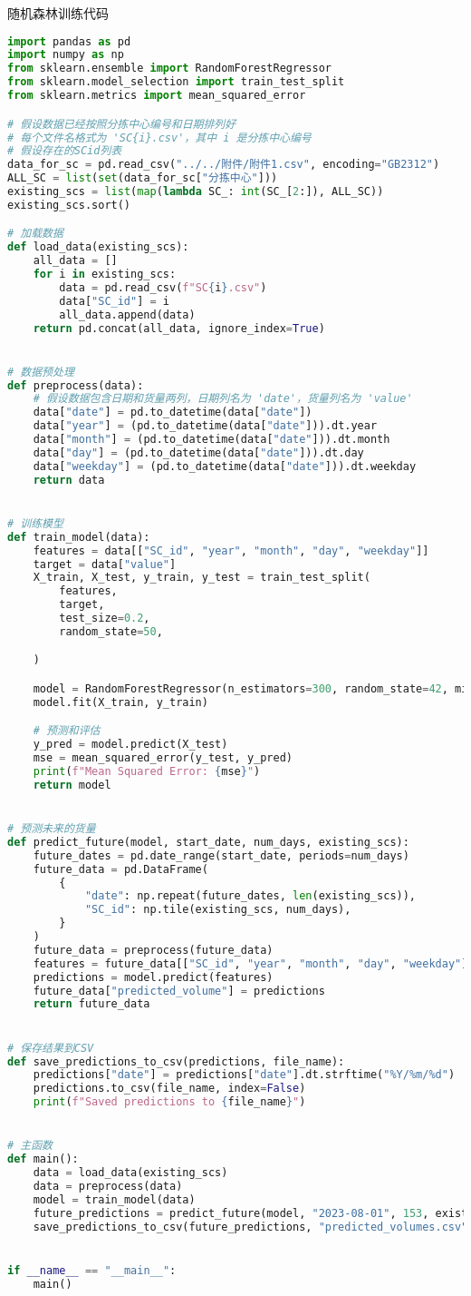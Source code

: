 \documentclass[UTF8,a4paper,10 pt]{article}%
\begin{document}
随机森林训练代码
\begin{lstlisting}[language=python]
import pandas as pd
import numpy as np
from sklearn.ensemble import RandomForestRegressor
from sklearn.model_selection import train_test_split
from sklearn.metrics import mean_squared_error

# 假设数据已经按照分拣中心编号和日期排列好
# 每个文件名格式为 'SC{i}.csv'，其中 i 是分拣中心编号
# 假设存在的SCid列表
data_for_sc = pd.read_csv("../../附件/附件1.csv", encoding="GB2312")
ALL_SC = list(set(data_for_sc["分拣中心"]))
existing_scs = list(map(lambda SC_: int(SC_[2:]), ALL_SC))
existing_scs.sort()

# 加载数据
def load_data(existing_scs):
    all_data = []
    for i in existing_scs:
        data = pd.read_csv(f"SC{i}.csv")
        data["SC_id"] = i
        all_data.append(data)
    return pd.concat(all_data, ignore_index=True)


# 数据预处理
def preprocess(data):
    # 假设数据包含日期和货量两列，日期列名为 'date'，货量列名为 'value'
    data["date"] = pd.to_datetime(data["date"])
    data["year"] = (pd.to_datetime(data["date"])).dt.year
    data["month"] = (pd.to_datetime(data["date"])).dt.month
    data["day"] = (pd.to_datetime(data["date"])).dt.day
    data["weekday"] = (pd.to_datetime(data["date"])).dt.weekday
    return data


# 训练模型
def train_model(data):
    features = data[["SC_id", "year", "month", "day", "weekday"]]
    target = data["value"]
    X_train, X_test, y_train, y_test = train_test_split(
        features,
        target,
        test_size=0.2,
        random_state=50,

    )

    model = RandomForestRegressor(n_estimators=300, random_state=42, min_samples_split=20)
    model.fit(X_train, y_train)

    # 预测和评估
    y_pred = model.predict(X_test)
    mse = mean_squared_error(y_test, y_pred)
    print(f"Mean Squared Error: {mse}")
    return model


# 预测未来的货量
def predict_future(model, start_date, num_days, existing_scs):
    future_dates = pd.date_range(start_date, periods=num_days)
    future_data = pd.DataFrame(
        {
            "date": np.repeat(future_dates, len(existing_scs)),
            "SC_id": np.tile(existing_scs, num_days),
        }
    )
    future_data = preprocess(future_data)
    features = future_data[["SC_id", "year", "month", "day", "weekday"]]
    predictions = model.predict(features)
    future_data["predicted_volume"] = predictions
    return future_data


# 保存结果到CSV
def save_predictions_to_csv(predictions, file_name):
    predictions["date"] = predictions["date"].dt.strftime("%Y/%m/%d")
    predictions.to_csv(file_name, index=False)
    print(f"Saved predictions to {file_name}")


# 主函数
def main():
    data = load_data(existing_scs)
    data = preprocess(data)
    model = train_model(data)
    future_predictions = predict_future(model, "2023-08-01", 153, existing_scs)
    save_predictions_to_csv(future_predictions, "predicted_volumes.csv")


if __name__ == "__main__":
    main()
\end{lstlisting}
\end{document}
